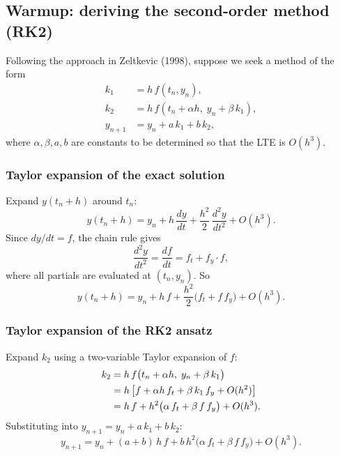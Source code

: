 \documentclass[12pt,a4paper]{article}
\theoremstyle{definition}
\theoremstyle{plain}
\theoremstyle{remark}
\begin{document}
\subsection{Warmup: deriving the second-order method (RK2)}

Following the approach in Zeltkevic (1998), suppose we seek a method of the form
\begin{equation}\label{eq:rk4app_rk2_ansatz}
  \begin{aligned}
    k_1 &= h\, f(t_n, y_n), \\
    k_2 &= h\, f(t_n + \alpha h, \; y_n + \beta\, k_1), \\
    y_{n+1} &= y_n + a\, k_1 + b\, k_2,
  \end{aligned}
\end{equation}
where $\alpha, \beta, a, b$ are constants to be determined so that the LTE is $O(h^3)$.

\subsubsection{Taylor expansion of the exact solution}

Expand $y(t_n + h)$ around $t_n$:
\begin{equation}\label{eq:rk4app_taylor2}
  y(t_n + h) = y_n + h\,\frac{dy}{dt} + \frac{h^2}{2}\,\frac{d^2 y}{dt^2} + O(h^3).
\end{equation}
Since $dy/dt = f$, the chain rule gives
\begin{equation}\label{eq:rk4app_d2y}
  \frac{d^2 y}{dt^2} = \frac{df}{dt} = f_t + f_y \cdot f,
\end{equation}
where all partials are evaluated at $(t_n, y_n)$. So
\begin{equation}\label{eq:rk4app_exact2}
  y(t_n + h) = y_n + h\,f + \frac{h^2}{2}\big(f_t + f\, f_y\big) + O(h^3).
\end{equation}

\subsubsection{Taylor expansion of the RK2 ansatz}

Expand $k_2$ using a two-variable Taylor expansion of $f$:
\begin{align}
  k_2 &= h\,f\big(t_n + \alpha h, \; y_n + \beta\, k_1\big) \notag\\
      &= h\left[f + \alpha h\, f_t + \beta\, k_1\, f_y + O(h^2)\right] \notag\\
      &= h\,f + h^2\big(\alpha\, f_t + \beta\, f\, f_y\big) + O(h^3). \label{eq:rk4app_k2_expand}
\end{align}
Substituting into $y_{n+1} = y_n + a\,k_1 + b\,k_2$:
\begin{equation}\label{eq:rk4app_rk2_expand}
  y_{n+1} = y_n + (a+b)\,h\,f + b\,h^2\big(\alpha\, f_t + \beta\, f\, f_y\big) + O(h^3).
\end{equation}
\end{document}
